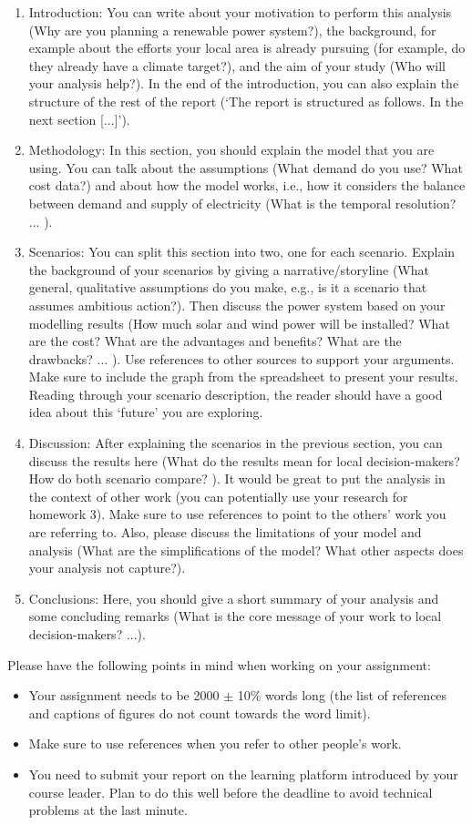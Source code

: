 \begin{enumerate}
\item Introduction: You can write about your motivation to perform this analysis (Why are you planning a renewable power system?), the background, for example about the efforts your local area is already pursuing (for example, do they already have a climate target?), and the aim of your study (Who will your analysis help?). In the end of the introduction, you can also explain the structure of the rest of the report (`The report is structured as follows. In the next section [...]').
\item Methodology: In this section, you should explain the model that you are using. You can talk about the assumptions (What demand do you use? What cost data?) and about how the model works, i.e., how it considers the balance between demand and supply of electricity (What is the temporal resolution? ... ).
\item Scenarios: You can split this section into two, one for each scenario. Explain the background of your scenarios by giving a narrative/storyline (What general, qualitative assumptions do you make, e.g., is it a scenario that assumes ambitious action?). Then discuss the power system based on your modelling results (How much solar and wind power will be installed? What are the cost? What are the advantages and benefits? What are the drawbacks? ... ). Use references to other sources to support your arguments. Make sure to include the graph from the spreadsheet to present your results. Reading through your scenario description, the reader should have a good idea about this `future' you are exploring.
\item Discussion: After explaining the scenarios in the previous section, you can discuss the results here (What do the results mean for local decision-makers? How do both scenario compare? ). It would be great to put the analysis in the context of other work (you can potentially use your research for homework 3). Make sure to use references to point to the others' work you are referring to. Also, please discuss the limitations of your model and analysis (What are the simplifications of the model? What other aspects does your analysis not capture?).
\item Conclusions: Here, you should give a short summary of your analysis and some concluding remarks (What is the core message of your work to local decision-makers? ...).
\end{enumerate}


Please have the following points in mind when working on your assignment:

\begin{itemize}
\item Your assignment needs to be 2000 $\pm$ 10\% words long (the list of references and captions of figures do not count towards the word limit).
\item Make sure to use references when you refer to other people's work.
\item You need to submit your report on the learning platform introduced by your course leader. Plan to do this well before the deadline to avoid technical problems at the last minute.
\end{itemize}

